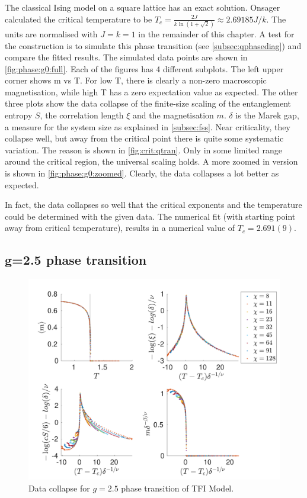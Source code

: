 The classical Ising model on a square lattice has an exact solution. Onsager calculated the critical temperature to be $T_c = \frac{2 J}{k \ln(1+\sqrt{2}) } \approx 2.69185 J/k$.  The units are normalised with $J=k=1$ in the remainder of this chapter. A test for the construction is to simulate this phase transition (see \cref{subsec:qphasediag}) and compare the fitted  results. The simulated data points are shown in \cref{fig:phase:g0:full}. Each of the figures has 4 different subplots. The left upper corner shows m vs T. For low T, there is clearly a non-zero macroscopic magnetisation, while high T has a zero expectation value as expected. The other three plots show the data collapse of the finite-size scaling of the entanglement entropy $S$, the correlation length $\xi$ and the magnetisation $m$. $\delta$ is the Marek gap, a measure for the system size as explained in \cref{subsec:fss}.  Near criticality, they collapse well, but away from the critical point there is quite some systematic variation. The reason is shown in \cref{fig:crit:qtran}. Only in some limited range around the critical region, the universal scaling holds. A more zoomed in version is shown in \cref{fig:phase:g0:zoomed}. Clearly, the data collapses a lot better as expected.

In fact, the data collapses so well that the critical exponents and the temperature could be determined with the given data. The numerical fit (with starting point away from  critical temperature), results in a numerical value of $T_c = 2.691(9) $.

\subsection{g=2.5 phase transition}

\begin{figure}[!htbp]
    \center
    \includegraphics[width=\textwidth]{Figuren/phasediag/g25/Full.pdf}
    \caption{ Data collapse for $g=2.5$ phase transition of \Gls{TFI} Model. }
    \label{fig:phase:g25:full}
\end{figure}

